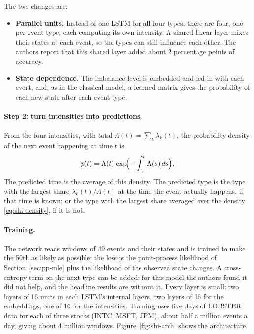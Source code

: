 The two changes are:
\begin{itemize}[leftmargin=1.5em,itemsep=1pt]
\item \textbf{Parallel units.} Instead of one LSTM for all four types, there are four, one per event type, each
  computing its own intensity. A shared linear layer mixes their states at each event, so the types can still
  influence each other. The authors report that this shared layer added about 2 percentage points of
  accuracy.
\item \textbf{State dependence.} The imbalance level is embedded and fed in with each event, and, as in the
  classical model, a learned matrix gives the probability of each new state after each event type.
\end{itemize}

\paragraph{Step 2: turn intensities into predictions.} From the four intensities, with total
$\Lambda(t) = \sum_k \lambda_k(t)$, the probability density of the next event happening at time $t$ is
\begin{equation}
p(t) = \Lambda(t)\, \exp\!\Bigl(-\int_{t_{n}}^{t} \Lambda(s)\,ds\Bigr),
\label{eq:shi-density}
\end{equation}
The predicted time is the average of this density. The predicted type is the type with the largest share
$\lambda_k(t)/\Lambda(t)$ at the time the event actually happens, if that time is known; or the type with the
largest share averaged over the density \eqref{eq:shi-density}, if it is not.

\paragraph{Training.} The network reads windows of 49 events and their states and is trained to make the
50th as likely as possible: the loss is the point-process likelihood of Section~\ref{sec:pp-mle} plus the
likelihood of the observed state changes. A cross-entropy term on the next type can be added; for this model
the authors found it did not help, and the headline results are without it. Every layer is small: two layers
of 16 units in each LSTM's internal layers, two layers of 16 for the embeddings, one of 16 for the intensities.
Training uses five days of LOBSTER data for each of three stocks (INTC, MSFT, JPM), about half a million
events a day, giving about 4 million windows. Figure~\ref{fig:shi-arch} shows the architecture.

